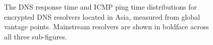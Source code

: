 \begin{figure}[t!]
\hfill%
%
\hfill%
%
\hfill%
%
    \caption{The DNS response time and ICMP ping time distributions for
    encrypted DNS resolvers located in Asia, measured from global vantage points.
    Mainstream resolvers are shown in boldface across all three
    sub-figures.}
\label{fig:dns-asia}
\end{figure}
\fi

